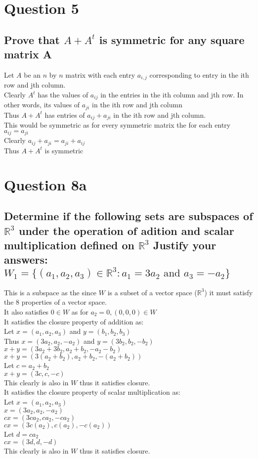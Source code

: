 \documentclass{article}
\begin{document}
\section*{Question 5}
\subsection*{Prove that $A + A^{t}$ is symmetric for any square matrix A }
Let $A$ be an $n$ by $n$ matrix with each entry $a_{i,j}$ corresponding to entry in the ith row and jth column.\\
Clearly $A^t$ has the values of $a_{ij}$ in the entries in the ith column and jth row. In other words, its values of $a_{ji}$ in the ith row and jth column\\
Thus $A + A^{t}$ has entries of $a_{ij}+a_{ji}$ in the ith row and jth column.\\
This would be symmetric as for every symmetric matrix the for each entry $a_{ij} = a_{ji}$\\
Clearly $a_{ij}+a_{ji} = a_{ji}+a_{ij}$\\
Thus $A + A^{t}$ is symmetric

\section*{Question 8a}
\subsection*{Determine if the following sets are subspaces of $\mathds{R}^3$ under the operation of adition and scalar multiplication defined on $\mathds{R}^3$ Justify your answers: $W_1 = \{(a_1, a_2,a_3) \in \mathds{R}^3: a_1 = 3a_2 \text{ and } a_3 = -a_2\}$}
This is a subspace as the since $W$ is a subset of a vector space ($\mathds{R}^3$) it must satisfy the 8 properties of a vector space.\\
It also satisfies $0 \in W$ as for $a_2 = 0, (0,0,0) \in W$\\
It satisfies the closure property of addition as:\\
Let $x = (a_1,a_2,a_3)$ and $y = (b_1,b_2,b_3)$\\
Thus $x = (3a_2,a_2,-a_2)$ and $y = (3b_2,b_2,-b_2)$\\
$x+y = (3a_2+3b_2,a_2+b_2,-a_2-b_2)$\\
$x+y = (3(a_2+b_2),a_2+b_2,-(a_2+b_2))$\\
Let $c = a_2+b_2$\\
$x+y = (3c,c,-c)$\\
This clearly is also in $W$ thus it satisfies closure.\\
It satisfies the closure property of scalar multiplication as:\\
Let $x = (a_1,a_2,a_3)$\\
$x = (3a_2,a_2,-a_2)$\\
$cx = (3ca_2,ca_2,-ca_2)$\\
$cx = (3c(a_2),c(a_2),-c(a_2))$\\
Let $d = ca_2$\\
$cx = (3d,d,-d)$\\
This clearly is also in $W$ thus it satisfies closure.\\
\end{document}
